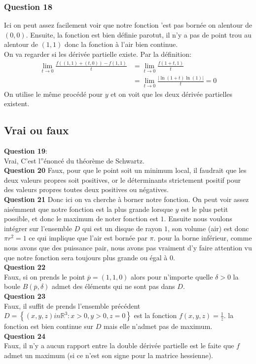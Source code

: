 \documentclass[a4paper]{article}
\begin{document}
\subsubsection{Question 18}

Ici on peut assez facilement voir que notre fonction 'est pas bornée on alentour de $\left(0, 0\right)$. Ensuite, la fonction est bien définie parotut, il n'y a pas de point trou au alentour de $\left(1, 1\right)$ donc la fonction à l'air bien continue.\\
On va regarder si les dérivée partielle existe. Par la définition:
\begin{align*} 
    \lim_{t \to 0} \frac{f\left(\left(1, 1\right) + \left(t, 0\right)\right)- f\left(1, 1\right)}{t} &= \lim_{t \to 0} \frac{f\left(1 + t, 1\right)}{t} \\
    &= \lim_{t \to 0} \frac{\left| \ln\left(1 + t\right)\ln\left(1\right)\right|}{t} = 0
\end{align*}
On utilise le même procédé pour $y$ et on voit que les deux dérivée partielles existent.
\subsection{Vrai ou faux}
\textbf{Question 19}:\\
Vrai, C'est l''énoncé du théorème de Schwartz.\\
\textbf{Question 20}
Faux, pour que le point soit un minimum local, il faudrait que les deux valeurs propres soit positives, or  le déterminants strictement positif pour des valeurs propres toutes deux positives ou négatives.\\
\textbf{Question 21}
Donc ici on va cherche à borner notre fonction. On peut voir assez aisémment que notre fonction est la plus grande lorsque $y$ est le plus petit possible, et donc le maximum de noter fonction est $1$. Ensuite nous voulons intégrer sur l'ensemble $D$ qui est un disque de rayon $1$, son volume (air) est donc $\pi r^2 = 1$ ce qui implique que l'air est bornée par $\pi$. pour la borne inférieur, comme nous avons que des puissance pair, nous avons pas vraiment d'y faire attention vu que notre fonction sera toujours plus grande ou égal à $0$.\\
\textbf{Question 22} \\
Faux, si on prends le point  $\overline{p} = \left(1, 1, 0\right)$ alors pour n'importe quelle $\delta > 0$ la boule $B\left( \overline{p}, \delta\right)$ admet des éléments  qui ne sont pas dans $D$.\\
\textbf{Question 23} \\
Faux, il suffit de prends l'ensemble précédent $D = \left\{\left(x, y, z\right) in \mathbb{R}^{3}: x > 0, y > 0, z = 0\right\}$ est la fonction $f\left(x, y, z\right) = \frac{1}{z}$. la fonction est bien continue sur $D$ mais elle n'admet pas de maximum.\\
\textbf{Question 24}\\

Faux, il n'y a aucun rapport entre la double dérivée partielle est le faite que $f$ admet un maximum (si ce n'est son signe pour la matrice hessienne).
\end{document}
